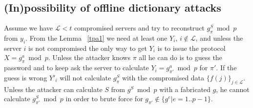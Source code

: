\subsection{(In)possibility of offline dictionary attacks}
Assume we have $\mathcal{L} < t$ compromised servers and try to
reconstruct $g_{\pi}^S \bmod p$ from ${y_i}$. From the Lemma
~\ref{tpa1} we need at least one $Y_i$, $i \notin \mathcal{L}$, and
unless the server $i$ is not compromised the only way to get $Y_i$ is
to issue the protocol $X = g_{\pi}^a \bmod p$. Unless the attacker
knows $\pi$ all he can do is to guess the password and to keep ask the
server to calculate $Y_i = g_{\pi'}^a \bmod p$ for $\pi'$. If the
guess is wrong $Y'_i$ will not calculate $g_{\pi}^S$ with the
compromised data $\{f(j)\}_{j \in \mathcal{L}}$.
Unless the attacker can calculate $S$ from $g^S \bmod p$ with a
fabricated $g$, he cannot calculate $g_{\pi'}^S \bmod p$ in
order to brute force for $g_{\pi'} \notin \{g^e | e = 1..p-1\}$.

